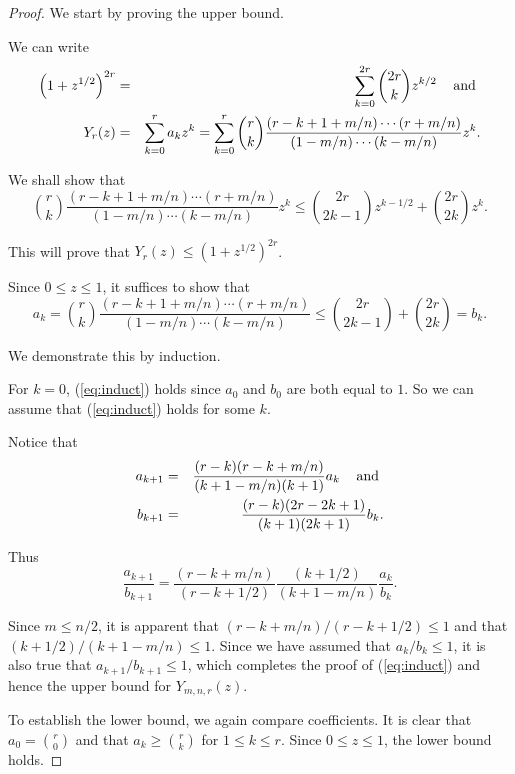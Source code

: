 \documentclass{jT}
\theoremstyle{definition}
\begin{document}
\begin{proof}
We start by proving the upper bound.

We can write 
\begin{eqnarray*}
{ \left( 1 + z^{1/2} \right) }^{2r} 
& = & \sum_{k=0}^{2r} {2r \choose k} z^{k/2} 
\hspace{3.0mm} \mbox{ and } \\
Y_{r}(z) 
& = & \sum_{k=0}^{r} a_{k} z^{k}
= \sum_{k=0}^{r} {r \choose k} 
                 \frac{(r-k+1+m/n) \cdots (r+m/n)}{(1-m/n) \cdots (k-m/n)} z^{k}.  
\end{eqnarray*}

We shall show that 
\begin{displaymath}
{r \choose k} \frac{(r-k+1+m/n) \cdots (r+m/n)}{(1-m/n) \cdots (k-m/n)} z^{k} 
\leq {2r \choose 2k-1} z^{k-1/2} + {2r \choose 2k} z^{k}.
\end{displaymath}

This will prove that $Y_{r}(z) \leq { \left( 1+z^{1/2} \right) }^{2r}$. 

Since $0 \leq z \leq 1$, it suffices to show that 
\begin{equation}
\label{eq:induct}
a_{k} = {r \choose k} \frac{(r-k+1+m/n) \cdots (r+m/n)}{(1-m/n) \cdots (k-m/n)}  
\leq {2r \choose 2k-1} + {2r \choose 2k} = b_{k}. 
\end{equation}

We demonstrate this by induction. 

For $k=0$, (\ref{eq:induct}) holds since $a_{0}$ and $b_{0}$ 
are both equal to $1$. So we can assume that (\ref{eq:induct}) 
holds for some $k$. 

Notice that 
\begin{eqnarray*}
a_{k+1} & = & \frac{(r-k)(r-k+m/n)}{(k+1-m/n)(k+1)}a_{k} \hspace{3.0mm} \mbox{ and } \\ 
b_{k+1} & = & \frac{(r-k)(2r-2k+1)}{(k+1)(2k+1)}b_{k}.
\end{eqnarray*}

Thus
\begin{displaymath}
\frac{a_{k+1}}{b_{k+1}} 
= \frac{(r-k+m/n)}{(r-k+1/2)}
  \frac{(k+1/2)}{(k+1-m/n)}
  \frac{a_{k}}{b_{k}}.  
\end{displaymath}

Since $m \leq n/2$, it is apparent that $(r-k+m/n)/(r-k+1/2) \leq 1$
and that $(k+1/2)/(k+1-m/n) \leq 1$. Since we have assumed that 
$a_{k}/b_{k} \leq 1$, it is also true that $a_{k+1}/b_{k+1} \leq 1$, 
which completes the proof of (\ref{eq:induct}) and hence the upper bound
for $Y_{m,n,r}(z)$.

To establish the lower bound, we again compare coefficients. It is clear that
$a_{0} = {r \choose 0}$ and that $a_{k} \geq {r \choose k}$ for $1 \leq k \leq r$.
Since $0 \leq z \leq 1$, the lower bound holds.
\end{proof}
\end{document}
